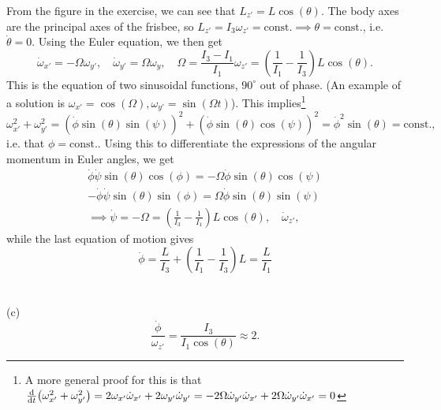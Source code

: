\documentclass{article}
\begin{document}
        From the figure in the exercise, we can see that $L_{z'} = L \cos(\theta)$. The body axes are the principal axes of the frisbee, so $L_{z'} = I_3 \omega_{z'} = \mathrm{const.} \implies \theta = \mathrm{const.}$, i.e. $\dot \theta = 0$. Using the Euler equation, we then get
        \begin{equation*}
            \dot \omega_{x'} = -\Omega \omega_{y'}, \quad \dot \omega_{y'} = \Omega \omega_{y}, \quad \Omega = \frac{I_3 - I_1}{I_1} \omega_{z'} = \left(\frac{1}{I_1} - \frac{1}{I_3}\right) L \cos(\theta).
        \end{equation*}
        This is the equation of two sinusoidal functions, $90^\circ$ out of phase. (An example of a solution is $\omega_{x'} = \cos(\Omega), \omega_{y'} = \sin(\Omega t)$). This implies\footnote{A more general proof for this is that $\dv t (\omega_{x'}^2 + \omega_{y'}^2) = 2\omega_{x'} \dot \omega_{x'} + 2 \omega_{y'} \dot \omega_{y'} = -2\Omega \dot \omega_{y'} \dot \omega_{x'} + 2\Omega \dot \omega_{y'} \dot \omega_{x'} = 0$ }
        \begin{equation*}
            \omega_{x'}^2 + \omega_{y'}^2 = \left( \dot \phi \sin(\theta) \sin(\psi) \right)^2 + \left( \dot \phi \sin(\theta)\cos(\psi) \right)^2 = \dot \phi^2 \sin(\theta) = \mathrm{const.},
        \end{equation*}
        i.e. that $\phi = \mathrm{const.}$. Using this to differentiate the expressions of the angular momentum in Euler angles, we get
        \begin{align*}
            \dot \phi \dot \psi \sin(\theta)\cos(\phi) = -\Omega \dot \phi \sin(\theta)\cos(\psi) \\
            -\dot \phi \dot \psi \sin(\theta)\sin(\phi) = \Omega \dot \phi \sin(\theta)\sin(\psi) \\
            \implies \dot \psi = -\Omega = \left(\frac{1}{I_3} - \frac{1}{I_1}\right) L \cos(\theta), \quad \dot \omega_{z'},
        \end{align*}
        while the last equation of motion gives
        \begin{equation*}
            \dot \phi = \frac{L}{I_3} + \left(\frac{1}{I_1} - \frac{1}{I_3}\right) L = \frac{L}{I_1}
        \end{equation*}
        \\ \\
        (c)
        \begin{equation*}
            \frac{\dot \phi}{\omega_{z'}} = \frac{I_3}{I_1 \cos(\theta)} \approx 2.
        \end{equation*}
\end{document}
